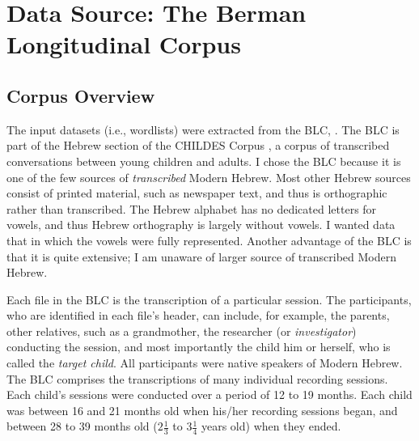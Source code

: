 \section{Data Source: The Berman Longitudinal Corpus}
\label{sec:datasource}
\subsection{Corpus Overview}
\label{sec:corpus-overview}
The input datasets (i.e., wordlists) were extracted 
from the \ac{BLC}, \citep{berman-weissenborn:1991}. 
The \ac{BLC} is part of the Hebrew section of the 
CHILDES Corpus \citep{macwhinney:2000a}, a corpus 
of transcribed conversations between young children 
and adults. I chose the \ac{BLC} because 
it is one of the few sources of \emph{transcribed} Modern Hebrew. 
Most other Hebrew sources consist of printed material, 
such as newspaper text, and thus is orthographic 
rather than transcribed. The Hebrew alphabet has no 
dedicated letters for vowels, and thus Hebrew 
orthography is largely without vowels. I wanted data 
that in which the vowels were 
fully represented. Another advantage of the \ac{BLC} is that 
it is quite extensive; I am unaware of larger source of 
transcribed Modern Hebrew. 

Each file in the \ac{BLC} is the transcription of a 
particular session. The participants, who are identified 
in each file's header, can include, for example, the parents,
 other relatives, such as a grandmother, 
the researcher (or \emph{investigator}) conducting the 
session, and most importantly the child him or herself, 
who is called the \emph{target child}. All participants 
were native speakers of Modern Hebrew. The \ac{BLC} comprises 
the transcriptions of many individual recording sessions. 
Each child's sessions were conducted over a period of 
12 to 19 months. Each child was between 16 and 21 months 
old when his/her recording sessions began, and between 
28 to 39 months old ($2\frac{1}{3}$ to $3\frac{1}{4}$ 
years old) when they ended.

